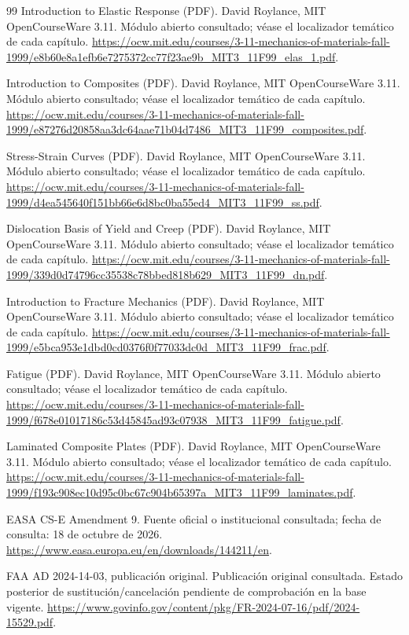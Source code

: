 \begin{thebibliography}{99}
 Introduction to Elastic Response (PDF). David Roylance, MIT OpenCourseWare 3.11. Módulo abierto consultado; véase el localizador temático de cada capítulo. \url{https://ocw.mit.edu/courses/3-11-mechanics-of-materials-fall-1999/e8b60e8a1efb6e7275372cc77f23ae9b_MIT3_11F99_elas_1.pdf}.

 Introduction to Composites (PDF). David Roylance, MIT OpenCourseWare 3.11. Módulo abierto consultado; véase el localizador temático de cada capítulo. \url{https://ocw.mit.edu/courses/3-11-mechanics-of-materials-fall-1999/e87276d20858aa3dc64aae71b04d7486_MIT3_11F99_composites.pdf}.

 Stress-Strain Curves (PDF). David Roylance, MIT OpenCourseWare 3.11. Módulo abierto consultado; véase el localizador temático de cada capítulo. \url{https://ocw.mit.edu/courses/3-11-mechanics-of-materials-fall-1999/d4ea545640f151bb66e6d8bc0ba55ed4_MIT3_11F99_ss.pdf}.

 Dislocation Basis of Yield and Creep (PDF). David Roylance, MIT OpenCourseWare 3.11. Módulo abierto consultado; véase el localizador temático de cada capítulo. \url{https://ocw.mit.edu/courses/3-11-mechanics-of-materials-fall-1999/339d0d74796cc35538c78bbed818b629_MIT3_11F99_dn.pdf}.

 Introduction to Fracture Mechanics (PDF). David Roylance, MIT OpenCourseWare 3.11. Módulo abierto consultado; véase el localizador temático de cada capítulo. \url{https://ocw.mit.edu/courses/3-11-mechanics-of-materials-fall-1999/e5bca953e1dbd0cd0376f0f77033dc0d_MIT3_11F99_frac.pdf}.

 Fatigue (PDF). David Roylance, MIT OpenCourseWare 3.11. Módulo abierto consultado; véase el localizador temático de cada capítulo. \url{https://ocw.mit.edu/courses/3-11-mechanics-of-materials-fall-1999/f678e01017186c53d45845ad93c07938_MIT3_11F99_fatigue.pdf}.

 Laminated Composite Plates (PDF). David Roylance, MIT OpenCourseWare 3.11. Módulo abierto consultado; véase el localizador temático de cada capítulo. \url{https://ocw.mit.edu/courses/3-11-mechanics-of-materials-fall-1999/f193c908ec10d95c0bc67c904b65397a_MIT3_11F99_laminates.pdf}.

 EASA CS-E Amendment 9. Fuente oficial o institucional consultada; fecha de consulta: 18 de octubre de 2026. \url{https://www.easa.europa.eu/en/downloads/144211/en}.

 FAA AD 2024-14-03, publicación original. Publicación original consultada. Estado posterior de sustitución/cancelación pendiente de comprobación en la base vigente. \url{https://www.govinfo.gov/content/pkg/FR-2024-07-16/pdf/2024-15529.pdf}.


\end{thebibliography}
